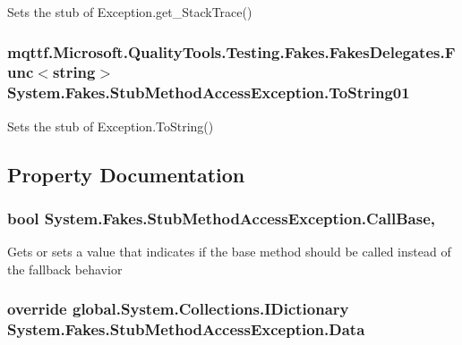 Sets the stub of Exception.\-get\-\_\-\-Stack\-Trace()

\hypertarget{class_system_1_1_fakes_1_1_stub_method_access_exception_ab26f4610af2feec9bc50ae5b10e00dd2}{
\subsubsection[{To\-String01}]{\setlength{\rightskip}{0pt plus 5cm}mqttf.\-Microsoft.\-Quality\-Tools.\-Testing.\-Fakes.\-Fakes\-Delegates.\-Func$<$string$>$ System.\-Fakes.\-Stub\-Method\-Access\-Exception.\-To\-String01}}\label{class_system_1_1_fakes_1_1_stub_method_access_exception_ab26f4610af2feec9bc50ae5b10e00dd2}


Sets the stub of Exception.\-To\-String()



\subsection{Property Documentation}
\hypertarget{class_system_1_1_fakes_1_1_stub_method_access_exception_abca31c874e3773ea7fb59d9221758181}{
\subsubsection[{Call\-Base}]{\setlength{\rightskip}{0pt plus 5cm}bool System.\-Fakes.\-Stub\-Method\-Access\-Exception.\-Call\-Base\hspace{0.3cm}{\ttfamily [get]}, {\ttfamily [set]}}}\label{class_system_1_1_fakes_1_1_stub_method_access_exception_abca31c874e3773ea7fb59d9221758181}


Gets or sets a value that indicates if the base method should be called instead of the fallback behavior

\hypertarget{class_system_1_1_fakes_1_1_stub_method_access_exception_aacb5bba4849a3c3458011bb157078d41}{
\subsubsection[{Data}]{\setlength{\rightskip}{0pt plus 5cm}override global.\-System.\-Collections.\-I\-Dictionary System.\-Fakes.\-Stub\-Method\-Access\-Exception.\-Data\hspace{0.3cm}{\ttfamily [get]}}}\label{class_system_1_1_fakes_1_1_stub_method_access_exception_aacb5bba4849a3c3458011bb157078d41}


